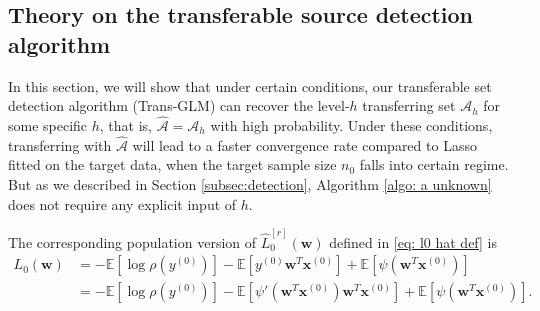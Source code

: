\documentclass[12pt]{article}
\newcommand{\te}{\mathbb{E}}
\newcommand{\bx}{\bm{x}}
\newcommand{\bxk}[1]{\bm{x}^{(#1)}}
\newcommand{\yk}[1]{y^{(#1)}}
\newcommand{\bw}{\bm{w}}
\newcommand{\ma}{\mathcal{A}}
\newcommand{\mah}{\mathcal{A}_h}
\newcommand{\<}{\langle}
\renewcommand{\>}{\rangle}
\begin{document}
\subsection{Theory on the transferable source detection algorithm}\label{subsec:detection theory}

In this section, we will show that under certain conditions, our transferable set detection algorithm (Trans-GLM) can recover the level-$h$ transferring set $\mah$ for some specific $h$, that is, $\widehat{\ma} = \mah$ with high probability. Under these conditions, transferring with $\widehat{\ma}$ will lead to a faster convergence rate compared to Lasso fitted on the target data, when the target sample size $n_0$ falls into certain regime. But as we described in Section \ref{subsec:detection}, Algorithm \ref{algo: a unknown} does not require any explicit input of $h$.


The corresponding population version of $\hat{L}_0^{[r]}(\bw)$ defined in \eqref{eq: l0 hat def} is
\begin{align}
	L_0(\bw)&= -\te[\log \rho(y^{(0)})]-\te[\yk{0}\bw^T\bxk{0}] + \te[\psi(\bm{w}^T\bx^{(0)})] \\
	&= -\te[\log \rho(y^{(0)})] -\te[\psi'(\bm{w}^T\bx^{(0)})\bw^T\bxk{0}] + \te[\psi(\bm{w}^T\bx^{(0)})].
\end{align}
\end{document}
